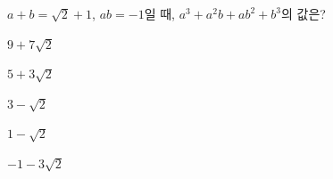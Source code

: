 $a+b=\sqrt{2}+1$, $ab=-1$일 때, $a^3+a^2b+ab^2+b^3$의 값은?
\begin{choices32}{\rule[-3ex]{0pt}{8ex}$9+7\sqrt{2}$}{\rule[-3ex]{0pt}{8ex}$5+3\sqrt{2}$}{\rule[-3ex]{0pt}{8ex}$3-\sqrt{2}$}{\rule[-3ex]{0pt}{8ex}$1-\sqrt{2}$}{\rule[-3ex]{0pt}{8ex}$-1-3\sqrt{2}$}\end{choices32}
